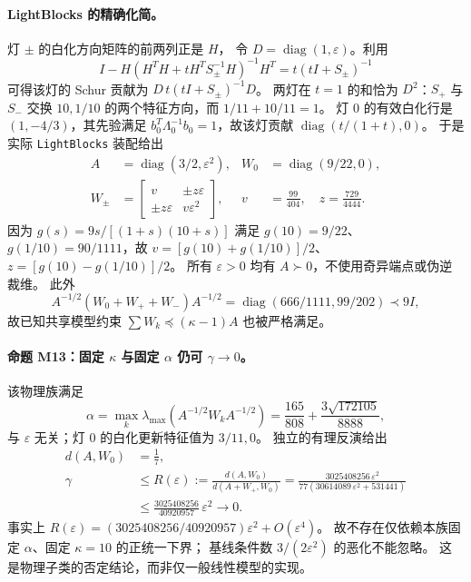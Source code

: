 \paragraph{LightBlocks 的精确化简。}
灯 $\pm$ 的白化方向矩阵的前两列正是 $H$，
令 $D=\operatorname{diag}(1,\varepsilon)$。利用
\[
 I-H(H^TH+tH^TS_\pm^{-1}H)^{-1}H^T
 =t(tI+S_\pm)^{-1}
\]
可得该灯的 Schur 贡献为 $D\,t(tI+S_\pm)^{-1}D$。
两灯在 $t=1$ 的和恰为 $D^2$：$S_+$ 与 $S_-$ 交换
$10,1/10$ 的两个特征方向，而 $1/11+10/11=1$。
灯 $0$ 的有效白化行是 $(1,-4/3)$，其先验满足
$b_0^T\Lambda_0^{-1}b_0=1$，故该灯贡献
$\operatorname{diag}(t/(1+t),0)$。
于是实际 \texttt{LightBlocks} 装配给出
\begin{align}
 A&=\operatorname{diag}(3/2,\varepsilon^2),
 &W_0&=\operatorname{diag}(9/22,0),\\
 W_\pm&=\begin{bmatrix}v&\pm z\varepsilon\\
                    \pm z\varepsilon&v\varepsilon^2\end{bmatrix},
 &v&=\frac{99}{404},\quad z=\frac{729}{4444}.
\end{align}
因为 $g(s)=9s/[(1+s)(10+s)]$ 满足
$g(10)=9/22$、$g(1/10)=90/1111$，故
$v=[g(10)+g(1/10)]/2$、$z=[g(10)-g(1/10)]/2$。
所有 $\varepsilon>0$ 均有 $A\succ0$，不使用奇异端点或伪逆裁维。
此外
\[
 A^{-1/2}(W_0+W_++W_-)A^{-1/2}
 =\operatorname{diag}(666/1111,99/202)\prec9I,
\]
故已知共享模型约束 $\sum W_k\preceq(\kappa-1)A$ 也被严格满足。

\paragraph{命题 M13：固定 $\kappa$ 与固定 $\alpha$ 仍可 $\gamma\to0$。}
该物理族满足
\[
 \alpha=\max_k\lambda_{\max}(A^{-1/2}W_kA^{-1/2})
 =\frac{165}{808}+\frac{3\sqrt{172105}}{8888},
\]
与 $\varepsilon$ 无关；灯 $0$ 的白化更新特征值为 $3/11,0$。
独立的有理反演给出
\begin{align}
 d(A,W_0)&=\frac17,\\
 \gamma&\le R(\varepsilon)
 :=\frac{d(A,W_0)}{d(A+W_+,W_0)}
 =\frac{3025408256\,\varepsilon^2}
 {77(30614089\,\varepsilon^2+531441)}\\
 &\le\frac{3025408256}{40920957}\,\varepsilon^2
 \longrightarrow0.
\end{align}
事实上 $R(\varepsilon)=(3025408256/40920957)\varepsilon^2+O(\varepsilon^4)$。
故不存在仅依赖本族固定 $\alpha$、固定 $\kappa=10$ 的正统一下界；
基线条件数 $3/(2\varepsilon^2)$ 的恶化不能忽略。
这是物理子类的否定结论，而非仅一般线性模型的实现。

